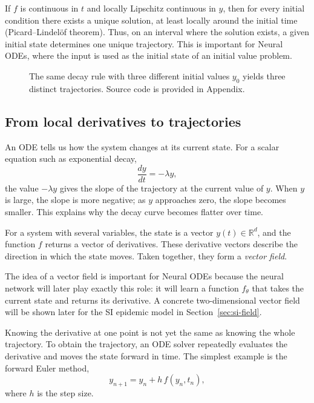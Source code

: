 \documentclass[11pt,a4paper]{article}
\newcommand{\figph}[2]{%
  \fbox{\parbox[c][3.2cm][c]{\dimexpr#1-2\fboxsep-2\fboxrule\relax}{%
    \centering\small\ttfamily [figure: #2]}}}
\begin{document}
If $f$ is continuous in $t$ and locally Lipschitz continuous in $y$, then
for every initial condition there exists a unique solution, at least locally
around the initial time (Picard--Lindel\"of theorem). Thus, on an interval
where the solution exists, a given initial state determines one unique
trajectory. This is important for Neural ODEs, where the input is used as the
initial state of an initial value problem.

\begin{figure}[h]
  \centering
  \figph{0.6\textwidth}{fig2\_three\_initial\_values}
  \caption{The same decay rule with three different initial values $y_0$ yields
  three distinct trajectories. Source code is provided in Appendix.}
  \label{fig:three-ivs}
\end{figure}

\subsection{From local derivatives to trajectories}

An ODE tells us how the system changes at its current state. For a scalar
equation such as exponential decay,
\[
    \frac{dy}{dt}=-\lambda y,
\]
the value $-\lambda y$ gives the slope of the trajectory at the current value
of $y$. When $y$ is large, the slope is more negative; as $y$ approaches zero,
the slope becomes smaller. This explains why the decay curve becomes flatter
over time.

For a system with several variables, the state is a vector
$y(t)\in\mathbb{R}^d$, and the function $f$ returns a vector of derivatives.
These derivative vectors describe the direction in which the state moves.
Taken together, they form a \emph{vector field}.

The idea of a vector field is important for Neural ODEs because the neural
network will later play exactly this role: it will learn a function
$f_\theta$ that takes the current state and returns its derivative. A concrete
two-dimensional vector field will be shown later for the SI epidemic model in
Section~\ref{sec:si-field}.

Knowing the derivative at one point is not yet the same as knowing the whole
trajectory. To obtain the trajectory, an ODE solver repeatedly evaluates the
derivative and moves the state forward in time. The simplest example is the
forward Euler method,
\begin{equation}
    y_{n+1}=y_n+h\,f(y_n,t_n),
    \label{eq:euler}
\end{equation}
where $h$ is the step size.
\end{document}
